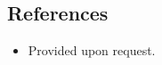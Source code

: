 \subsection*{References}
\begin{itemize}[itemsep=1pt, parsep=0pt,leftmargin=*]
\item[] Provided upon request.
\end{itemize}
